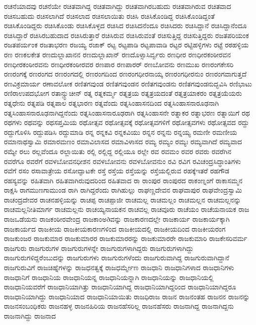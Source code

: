 {ರಚನೆಯಾದವು
ರಚನೆಯೇ
ರಚಿತವಾಗಿದ್ದ
ರಚಿತವಾಗಿದ್ದು
ರಚಿತವಾಗಿರಬಹುದು
ರಚಿತವಾಗಿರುವ
ರಚಿತವಾದ
ರಚಿಸಬಹುದು
ರಚಿಸಲಾಗಿದೆ
ರಚಿಸಲಾದ
ರಚಿಸಲಾಯಿತು
ರಚಿಸಿ
ರಚಿಸಿಕೊಂಡಿದ್ದ
ರಚಿಸಿಕೊಂಡಿದ್ದಂತೆ
ರಚಿಸಿಕೊಂಡಿದ್ದರು
ರಚಿಸಿಕೊಂಡು
ರಚಿಸಿಕೊಳ್ಳದ
ರಚಿಸಿದ
ರಚಿಸಿದನೆಂದೂ
ರಚಿಸಿದರು
ರಚಿಸಿದ್ದಾನೆ
ರಚಿಸಿದ್ದಾನೆಂದೂ
ರಚಿಸಿದ್ದಾರೆ
ರಚಿಸಿರಬಹುದಾದ
ರಚಿಸಿರುತ್ತಾರೆ
ರಚಿಸಿರುವ
ರಚಿಸಿರುವಂತೆ
ರಚಿಸುತ್ತಿದ್ದ
ರಚಿಸುತ್ತಿದ್ದರು
ರಜತಪರಿಯಂಕ
ರಜತಪರ್ಯಂಕ
ರಜತಾಭರಣ
ರಜಯ್ಯ
ರಜಾಕ್
ರಟ್ಟ
ರಟ್ಟಪಾಡಿ
ರಟ್ಟಪಾವಾಡಿ
ರಟ್ಟರ
ರಟ್ಟಿಹಳ್ಳಿಗಳು
ರಟ್ಟೆ
ರಠಹಳ್ಳಿಯ
ರಣ
ರಣಕಲಕೇತ
ರಣದುಲ್ಲಾಖಾನನ
ರಣದುಲ್ಲಾಖಾನ್
ರಣದೊಳ್ಸಾಸಿರ್ವ್ವರು
ರಣಧೀರ
ರಣಧೀರಕಂಠೀರವನ
ರಣಧೀರಕಂಠೀರವನು
ರಣಧೀರಕಂಠೀರವರ
ರಣಪಾರ
ರಣಪಾರರ್
ರಣಬೋವನು
ರಣಮುಖ
ರಣರಂಗಕೇಸರಿ
ರಣರಂಗಕ್ಕೆ
ರಣರಂಗದ
ರಣರಂಗದಲ್ಲಿ
ರಣರಂಗದಿಂದ
ರಣರಂಗಧೀರನಾಯ್ಕ
ರಣರಂಗಧೀರನುಂ
ರಣರಂಗವಾಗುತ್ತದೆ
ರಣವಿಕ್ರಮಾರ್ಯ
ರಣಾವಲೋಕ
ರಣಿತಗವುಂಡ
ರಣಿತಗವುಂಡನ
ರಣಿತಗವುಂಡನು
ರಣಿತಗವುಂಡನುದ್ಭವಿಸಿ
ರಣಿಭಾಟು
ರಣಿರಾಉಪದಭೋಗ
ರತಾನ್ಚ್ಛುಚೀನ್
ರತ್ನ
ರತ್ನಕರ್ಮ್ಮ
ರತ್ನತ್ರಯ
ರತ್ನತ್ರಯದಂತೆ
ರತ್ನತ್ರಯಾಕರಂ
ರತ್ನತ್ರಯೆಯರು
ರತ್ನಧೇನು
ರತ್ನಪಡಿ
ರತ್ನಪಾಲ
ರತ್ನಭಾರಣ
ರತ್ನವೆಂದು
ರತ್ನಸಿಂಹಾಸನದಿಂದ
ರತ್ನಸಿಂಹಾಸನಾರೂಢನಾಗಿ
ರತ್ನಸಿಂಹಾಸನಾರೂಢನಾಗಿದ್ದನೆಂದು
ರತ್ನಸಿಂಹಾಸನಾರೂಢರಾಗಿ
ರತ್ನಸಿಂಹಾಸನೇ
ರತ್ನಾಕರ
ರತ್ನಾಭರಣ
ರತ್ನಾಯಿಗೆ
ರಥ
ರಥಗಳು
ರಥವನ್ನು
ರಥಸಪ್ತಮಿಯ
ರಥೋತ್ಸವ
ರಥೋತ್ಸವಕ್ಕೆ
ರಥೋತ್ಸವಗಳಿಗೆ
ರಥೋತ್ಸವಗಳು
ರಥೋತ್ಸವದ
ರದ್ದು
ರದ್ದುಗೊಳಿಸಿ
ರದ್ದುಪಡಿಸಿ
ರದ್ದುಮಾಡಿ
ರನ್ನ
ರನ್ನಕವಿ
ರನ್ನಕವಿಯು
ರನ್ನನ
ರನ್ನನು
ರನ್ನಯ್ಯ
ರಮಣೀ
ರಮಣೀಯ
ರಮಾನಾಥಸ್ವಾಮಿ
ರಮಾರಮಣಂ
ರಮಾವಿಲಾಸದ
ರಮಾವಿಳಾಸದ
ರಮ್ಯ
ರಮ್ಯಂ
ರಮ್ಯಃ
ರಮ್ಯವಾಗಿದೆ
ರಮ್ಯವಾದ
ರಮ್ಯೇ
ರಲು
ರಲ್ಲವೆಂದೂ
ರಲ್ಲಾಯಿತು
ರಲ್ಲಿ
ರಲ್ಲಿದ್ದ
ರಲ್ಲಿಯೂ
ರಲ್ಲೇ
ರವ
ರವಮಂ
ರವರ
ರವರು
ರವರೆಗಿನ
ರವರೆಗೂ
ರವರೆಗೆ
ರವಳಬೋವನಧೀಶನ
ರವಳಬೋವನು
ರವಳಬೋವನುಂ
ರವಿ
ರವಿಗ
ರವಿಚಂದ್ರಸಿದ್ಧಾಂತಿಗಳು
ರವೆಗೆ
ರಸಂ
ರಸಾವಾತ್ರೇಯ
ರಸೋದ್ಘಾಟಕೇ
ರಸ್ತೆ
ರಸ್ತೆಯ
ರಸ್ತೆಯನ್ನು
ರಸ್ತೆಯಲ್ಲಿರುವ
ರಹಕ್ಕೆಇತರೆ
ರಹಗೌಡ
ರಹಸ್ಯವನ್ನು
ರಹಿತವಾಗಿ
ರಹಿತವಾಗಿರುವುದರಿಂದ
ರಹಿತವಾದ
ರಾ
ರಾಂಪುರ
ರಾಂಪುರದ
ರಾಕಂಣ್ನಂಗೆ
ರಾಕಾಸಮ್ಮನ
ರಾಕ್ಷಸಿ
ರಾಗಮುಣಗಾಮುಂಡ
ರಾಗಿ
ರಾಗಿದ್ದರೆಂದು
ರಾಗಿಹುಲ್ಲು
ರಾಘಣ್ಣದೇವನ
ರಾಘವಾಪುರ
ರಾಘವೇಂದ್ರಸ್ವಾಮಿ
ರಾಚಂದ್ರದೇವರ
ರಾಚನಹಳ್ಳಿಯನ್ನು
ರಾಚಪ್ಪ
ರಾಚಪ್ಪಾಜೀ
ರಾಚಮಲ್ಲ
ರಾಚಮಲ್ಲಂ
ರಾಚಮಲ್ಲನ
ರಾಚಮಲ್ಲನನ್ನು
ರಾಚಮಲ್ಲನೀತಿಮಾರ್ಗ
ರಾಚಮಲ್ಲನು
ರಾಚಯ್ಯನಾಯಕನ
ರಾಚವಲ್ಲ
ರಾಚವೂರು
ರಾಚೆಯಂ
ರಾಚೆಯನಾಯಕ
ರಾಜ
ರಾಜಒಡೆಯನು
ರಾಜಕಂಠೀರವೇಂದ್ರ
ರಾಜಕಾಂಅðವನ್ನು
ರಾಜಕಾರಣದಲ್ಲೇ
ರಾಜಕಾರ್ಯ
ರಾಜಕಾರ್ಯಕ್ಕಾಗಿ
ರಾಜಕಾರ್ಯದ
ರಾಜಕೀಯ
ರಾಜಕೀಯಕಾರಣಗಳಿಂದ
ರಾಜಕೀಯದಲ್ಲಿ
ರಾಜಕೀಯದಿಂದ
ರಾಜಕೀಯರಂಗ
ರಾಜಕುಂಜರ
ರಾಜಕುಮಾರ
ರಾಜಕುಮಾರರ
ರಾಜಕುಮಾರರನ್ನು
ರಾಜಕುಮಾರರೇ
ರಾಜಕುಮಾರಿ
ರಾಜಕೇಸರಿವರ್ಮ
ರಾಜಗುರು
ರಾಜಗುರುಗಳ
ರಾಜಗುರುಗಳನ್ನೇ
ರಾಜಗುರುಗಳಾಗಿದ್ದರು
ರಾಜಗುರುಗಳಾಗಿದ್ದು
ರಾಜಗುರುಗಳಿದ್ದರೆಂಬುದನ್ನು
ರಾಜಗುರುಗಳು
ರಾಜಗುರುಗಳೆಂದು
ರಾಜಗುರುವಾಗಿದ್ದ
ರಾಜಗುರುವಾಗಿದ್ದಾನೆ
ರಾಜಗುರುವಿಗೆ
ರಾಜಚಿಹ್ನೆಗಳನ್ನು
ರಾಜಧನತ್ವಕ್ಕೆ
ರಾಜಧರ್ಮ್ಮೇಣ
ರಾಜಧಾನಿ
ರಾಜಧಾನಿಗಳಾದ
ರಾಜಧಾನಿಗಳು
ರಾಜಧಾನಿಗೆ
ರಾಜಧಾನಿಯ
ರಾಜಧಾನಿಯನ್ನ
ರಾಜಧಾನಿಯನ್ನಾಗಿ
ರಾಜಧಾನಿಯನ್ನು
ರಾಜಧಾನಿಯಲ್ಲಿ
ರಾಜಧಾನಿಯವರೆಗೆ
ರಾಜಧಾನಿಯಾಗಿತ್ತು
ರಾಜಧಾನಿಯಾಗಿದ್ದ
ರಾಜಧಾನಿಯಾಗಿದ್ದರಿಂದ
ರಾಜಧಾನಿಯಾಗಿದ್ದರೂ
ರಾಜಧಾನಿಯಾಗಿದ್ದು
ರಾಜಧಾನಿಯಾದ
ರಾಜಧಾನಿಯಾಯಿತು
ರಾಜಧಿರಾಜ
ರಾಜನ
ರಾಜನಂತಹ
ರಾಜನನ
ರಾಜನನ್ನು
ರಾಜನಸಂಬಂಧಿಕರು
ರಾಜನಹಳ್ಳ
ರಾಜನಹಿರಿಯ
ರಾಜನಹೆಸರಿಲ್ಲ
ರಾಜನಹೆಸರು
ರಾಜನಾಗಿದ್ದ
ರಾಜನಾಗಿದ್ದನು
ರಾಜನಾಗಿದ್ದು
ರಾಜನಾದ
}
